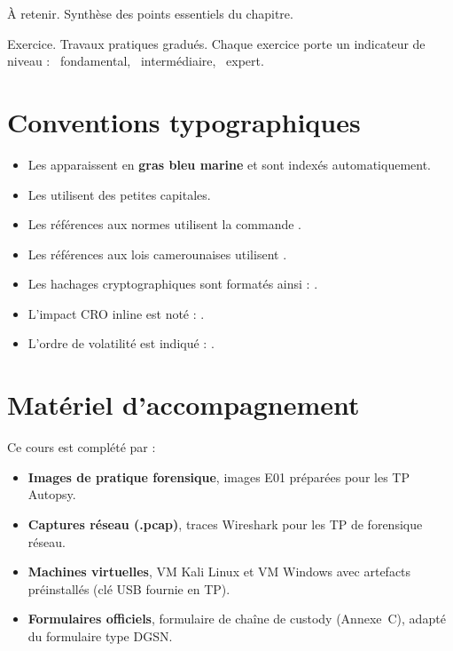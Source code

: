 \begin{boxresume}
À retenir. Synthèse des points essentiels du chapitre.
\end{boxresume}

\begin{boxexo}
Exercice. Travaux pratiques gradués. Chaque exercice porte un indicateur
de niveau : \niveaubase\ fondamental, \niveaumoyen\ intermédiaire,
\niveauexpert\ expert.
\end{boxexo}

\section*{Conventions typographiques}

\begin{itemize}
    \item Les  apparaissent en \textbf{gras bleu marine}
          et sont indexés automatiquement.
    \item Les  utilisent des petites capitales.
    \item Les références aux normes utilisent la commande .
    \item Les références aux lois camerounaises utilisent .
    \item Les hachages cryptographiques sont formatés ainsi :
          .
    \item L'impact CRO inline est noté : .
    \item L'ordre de volatilité est indiqué : .
\end{itemize}

\section*{Matériel d'accompagnement}

Ce cours est complété par :
\begin{itemize}
    \item \textbf{Images de pratique forensique}, images E01 préparées pour
          les TP Autopsy.
    \item \textbf{Captures réseau (.pcap)}, traces Wireshark pour les TP
          de forensique réseau.
    \item \textbf{Machines virtuelles}, VM Kali Linux et VM Windows avec
          artefacts préinstallés (clé USB fournie en TP).
    \item \textbf{Formulaires officiels}, formulaire de chaîne de custody
          (Annexe~C), adapté du formulaire type DGSN.
\end{itemize}

